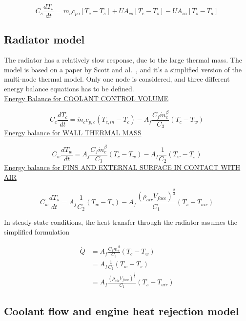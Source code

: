 \begin{equation}
  C_s \frac{dT_s}{dt} = \dot{m}_oc_{po}[T_c-T_s]+UA_{cs}[T_c-T_s]-UA_{sa}[T_s-T_a]
\end{equation}


\subsection{Radiator model}

The radiator has a relatively slow response, due to the large thermal mass. The model is based on a paper by Scott and al.~\cite{Scott2003}, and it's a simplified version of the multi-node thermal model. Only one node is considered, and three different energy balance equations has to be defined. \\
\uline{Energy Balance for COOLANT CONTROL VOLUME}

\begin{equation}
  C_c \frac{dT_c}{dt} = \dot{m}_cc_{p,c}(T_{c,in}-T_c)-A_f \frac{C_f\dot{m}_c^\beta}{C_3}(T_c-T_w)
\end{equation}
\uline{Energy balance for WALL THERMAL MASS}

\begin{equation}
  C_w  \frac{dT_w}{dt} = A_f \frac{C_f\dot{m}_c^\beta}{C_3}(T_c-T_w) - A_f \frac{1}{C_2}(T_w-T_s)
\end{equation}
\uline{Energy balance for FINS AND EXTERNAL SURFACE IN CONTACT WITH AIR}

\begin{equation}
  C_w  \frac{dT_s}{dt} = A_f \frac{1}{C_2}(T_w-T_s) - A_f \frac{(\rho_{air}V_{face})^\frac{2}{3}}{C_1}(T_s-T_{air})
\end{equation}

In steady-state conditions, the heat transfer through the radiator assumes the simplified formulation

\begin{equation}
  \begin{split}
    \dot{Q} &= A_f \frac{C_f\dot{m}_c^\beta}{C_3}(T_c-T_w) \\ &= A_f \frac{1}{C_2}(T_w-T_s) \\ &= A_f \frac{(\rho_{air}V_{face})^{\frac{2}{3}}}{C_1}(T_s-T_{air})
  \end{split}
\end{equation}

\subsection{Coolant flow and engine heat rejection model}

